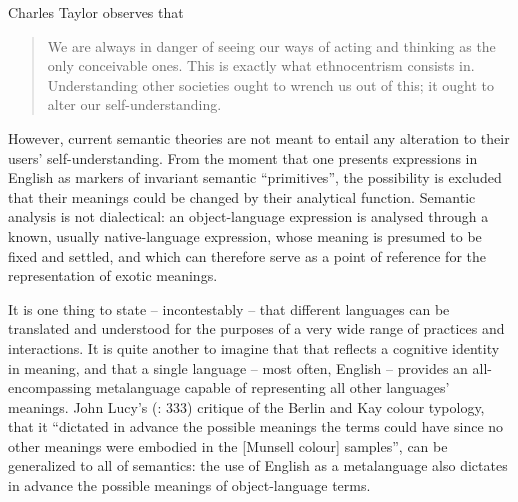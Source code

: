 \documentclass[output=paper]{langscibook}
\begin{document}
Charles Taylor observes that

\begin{quotation}
We are always in danger of seeing our ways of acting and thinking as the only conceivable ones. This is exactly what ethnocentrism consists in. Understanding other societies ought to wrench us out of this; it ought to alter our self-understanding. \citep[129]{Taylor1985}
\end{quotation}

\noindent However, current semantic theories are not meant to entail any alteration to their users' self-understanding.  From the moment that one presents expressions in English as markers of invariant semantic ``primitives'', the possibility is excluded that their meanings could be changed by their analytical function. Semantic analysis is not dialectical: an object-language expression is analysed through a known, usually native-language expression, whose meaning is presumed to be fixed and settled, and which can therefore serve as a point of reference for the representation of exotic meanings.

It is one thing to state -- incontestably -- that different languages can be translated and understood for the purposes of a very wide range of practices and interactions. It is quite another to imagine that that reflects a cognitive identity in meaning, and that a single language -- most often, English -- provides an all-encompassing metalanguage capable of representing all other languages' meanings. John Lucy's (\citeyear{Lucy1997}: 333) critique of the Berlin and Kay colour typology, that it ``dictated in advance the possible meanings the terms could have since no other meanings were embodied in the [Munsell colour] samples'', can be generalized to all of semantics: the use of English as a metalanguage also dictates in advance the possible meanings of object-language terms.
\end{document}
